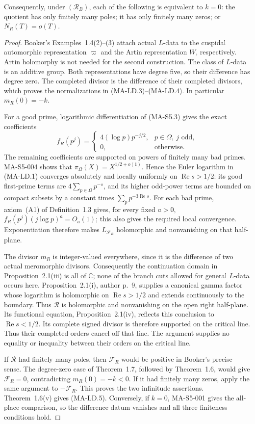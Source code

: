 Consequently, under $(\mathcal R_B)$, each of the following is
equivalent to $k=0$: the quotient has only finitely many poles;
it has only finitely many zeros; or $N_R(T)=o(T)$.

\begin{proof}
Booker's Examples~1.4(2)--(3) attach actual $L$-data to the
cuspidal automorphic representation $\varpi$ and the Artin
representation $W$, respectively. Artin holomorphy is not
needed for the second construction. The class of $L$-data is
an additive group. Both representations have degree five,
so their difference has degree zero. The completed divisor is
the difference of their completed divisors, which proves the
normalizations in (MA-LD.3)--(MA-LD.4). In particular
$m_R(0)=-k$.

For a good prime, logarithmic differentiation of (MA-S5.3)
gives the exact coefficients
\[
 f_R(p^j)=
 \begin{cases}
 4(\log p)p^{-j/2},&p\in\Omega,\ j\text{ odd},\\
 0,&\text{otherwise}.
 \end{cases}
 \tag{MA-LD.6}
\]
The remaining coefficients are supported on powers of finitely
many bad primes. MA-S5-004 shows that
$\pi_\Omega(X)=X^{1/2+o(1)}$. Hence the Euler logarithm in
(MA-LD.1) converges absolutely and locally uniformly on
$\operatorname{Re}s>1/2$: its good first-prime terms are
$4\sum_{p\in\Omega}p^{-s}$, and its higher odd-power terms
are bounded on compact subsets by a constant times
$\sum_p p^{-3\operatorname{Re}s}$.
For each bad prime, axiom~(A1) of Definition~1.3 gives, for
every fixed $a>0$,
$f_R(p^j)(j\log p)^a=O_a(1)$; this also gives the required
local convergence. Exponentiation therefore makes
$L_{\mathcal F_R}$ holomorphic and nonvanishing on that
half-plane.

The divisor $m_R$ is integer-valued everywhere, since it is the
difference of two actual meromorphic divisors. Consequently the
continuation domain in Proposition~2.1(iii) is all of $\mathbb C$;
none of the branch cuts allowed for general $L$-data occurs here.
Proposition~2.1(i), author p.~9, supplies a canonical gamma
factor whose logarithm is holomorphic on
$\operatorname{Re}s>1/2$ and extends continuously to the
boundary. Thus $\mathscr R$ is holomorphic and nonvanishing
on the open right half-plane. Its functional equation,
Proposition~2.1(iv), reflects this conclusion to
$\operatorname{Re}s<1/2$. Its complete signed divisor is
therefore supported on the critical line. Thus their completed
orders cancel off that line. The argument supplies no equality
or inequality between their orders on the critical line.

If $\mathscr R$ had finitely many poles, then
$\mathcal F_R$ would be positive in Booker's precise sense.
The degree-zero case of Theorem~1.7, followed by
Theorem~1.6, would give $\mathcal F_R=0$, contradicting
$m_R(0)=-k<0$. If it had finitely many zeros, apply the same
argument to $-\mathcal F_R$. This proves the two infinitude
assertions. Theorem~1.6(v) gives (MA-LD.5).
Conversely, if $k=0$, MA-S5-001 gives the all-place comparison,
so the difference datum vanishes and all three finiteness
conditions hold.\end{proof}


